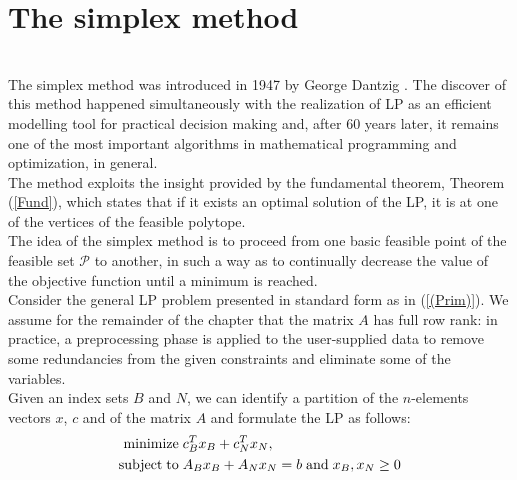 \documentclass[a4paper,10 pt,titlepage,twoside]{book}
\theoremstyle{plain}
\theoremstyle{definition}
\theoremstyle{remark}
\begin{document}
\chapter{The simplex method}\\
The simplex method was introduced in 1947 by George Dantzig \cite{DAN1}. The discover of this method happened simultaneously with the realization of LP as an efficient modelling tool for practical decision making and, after 60 years later, it remains one of the most important algorithms in mathematical programming and
optimization, in general.\\
The method exploits the insight provided by the fundamental theorem, Theorem
(\ref{Fund}), which states that if it exists an optimal solution of the LP, it is at one of the vertices of the feasible polytope. \\
The idea of the simplex method is to proceed from one basic feasible point of the feasible set $\mathcal{P}$ to another, in such a way as to continually decrease the value of the objective
function until a minimum is reached.\\ Consider the general LP problem presented in standard form as in (\ref{(Prim)}).
We assume for the remainder of the chapter that the matrix $A$ has full row rank: in practice, a preprocessing phase is applied to the user-supplied data to remove some
redundancies from the given constraints and eliminate some of the variables.\\Given an index sets $B$ and $N$, we can identify a partition of the $n$-elements vectors $x$, $c$ and of the matrix $A$ and formulate the LP as follows:
\begin{equation}
\begin{split}
\text{minimize\;} &c^{T}_{B}x_{B}+c^{T}_{N}x_{N},\\
\text{subject\;to\;}&A_{B}x_{B}+A_{N}x_{N} = b\text{\;and\;}x_{B}, x_{N}\geq0
\end{split}
\end{equation}
\end{document}
